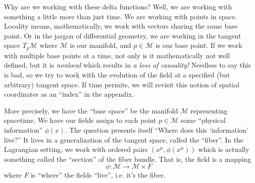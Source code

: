 \begin{ddanger}
Why are we working with these delta functions? Well, we are
working  with something a little more than just time. We are
working with points in space. Locality means, mathematically, we
work with vectors sharing the same base point. Or in the jargon
of differential geometry, we are working in the tangent space
$T_{p}\mathcal{M}$ where $\mathcal{M}$ is our manifold, and
$p\in\mathcal{M}$ is our base point. If we work with multiple
base points at a time, not only is it mathematically not well
defined, but it is \emph{nonlocal} which results in \emph{a loss of causality!}
Needless to say this is bad, so we try to work with the evolution
of the field at a specified (but arbitrary) tangent space. If
time permits, we will revisit this notion of spatial coordinates
as an ``index'' in the appendix.

More precisely, we have the ``base space'' be the manifold
$\mathcal{M}$ representing spacetime. We have our fields assign
to each point $p\in\mathcal{M}$ some ``physical information''
$\phi(x)$. The question presents itself ``Where does this
`information' live?'' It lives in a generalization of the tangent
space, called the ``fiber''. In the Lagrangian setting, we work
with ordered pairs $(x^{\mu},\phi(x^{\mu}))$ which is actually
something called the ``section'' of the fiber bundle. That is,
the field is a mapping
\begin{equation}%
\phi:\mathcal{M}\to\mathcal{M}\times{F}
\end{equation}
where $F$ is ``where'' the fields ``live'', i.e. it's the fiber.
\end{ddanger}

